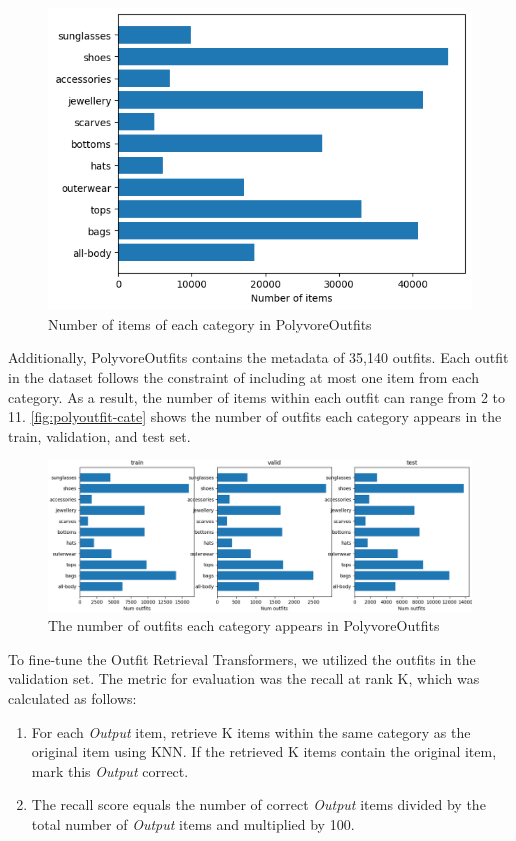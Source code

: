 \begin{figure}[h!]
    \centering
    \includegraphics[width=0.6\linewidth]{content/resources/images/fashion-recommendation/chapter4-polyvore-cate.png}
    \caption{Number of items of each category in PolyvoreOutfits}
    \label{fig:polyvore-cate}
    \vspace{-2mm}
\end{figure}

Additionally, PolyvoreOutfits contains the metadata of 35,140 outfits. Each outfit in the dataset follows the constraint of including at most one item from each category. As a result, the number of items within each outfit can range from 2 to 11.
\autoref{fig:polyoutfit-cate} shows the number of outfits each category appears in the train, validation, and test set.

\begin{figure}[h!]
    \centering
    \includegraphics[width=\linewidth]{content/resources/images/fashion-recommendation/chapter4-polyoutfit-cate.png}
    \caption{The number of outfits each category appears in PolyvoreOutfits}
    \label{fig:polyoutfit-cate}
\end{figure}

To fine-tune the Outfit Retrieval Transformers, we utilized the outfits in the validation set. 
The metric for evaluation was the recall at rank K, which was calculated as follows:
\begin{enumerate}
    \item For each \textit{Output} item, retrieve K items within the same category as the original item using KNN. If the retrieved K items contain the original item, mark this \textit{Output} correct.
    \item The recall score equals the number of correct \textit{Output} items divided by the total number of \textit{Output} items and multiplied by 100.
\end{enumerate} 

